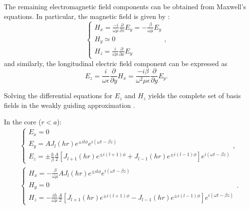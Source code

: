The remaining electromagnetic field components can be obtained from Maxwell's equations. In particular, the magnetic field is given by \cite{yariv2007photonics}:
\begin{equation}
    \begin{cases}
        H_x=\frac{-i}{\omega\mu}\frac{\partial}{\partial z}E_y = -\frac{\beta}{\omega\mu}E_y \\
        H_y \simeq 0                                                                         \\
        H_z = \frac{i}{\omega\mu}\frac{\partial}{\partial x}E_y
    \end{cases},
\end{equation}
and similarly, the longitudinal electric field component can be expressed as
\begin{equation}
    E_z = \frac{i}{\omega\epsilon}\frac{\partial}{\partial y}H_x = \frac{-i\beta}{\omega^2\mu\epsilon}\frac{\partial}{\partial y}E_y.
\end{equation}

Solving the differential equations for $E_z$ and $H_z$ yields the complete set of basis fields in the weakly guiding approximation \cite{yariv2007photonics}.

In the core ($r<a$):
\begin{align}
    & \begin{cases}
        E_x = 0                                                  \\
        E_y = A J_l(hr) e^{\pm il\phi} e^{i(\omega t - \beta z)} \\
        E_z = \pm \frac{h}{\beta}\frac{A}{2} [J_{l+1}(hr)e^{\pm i(l+1)\phi} + J_{l-1}(hr)e^{\pm i(l-1)\phi}] e^{i(\omega t - \beta z)}
    \end{cases},\label{eq:E_core}        \\[3mm]
    & \begin{cases}
        H_x = -\frac{\beta}{\omega\mu} A J_l(hr) e^{\pm il\phi} e^{i(\omega t - \beta z)} \\
        H_y =0\\
        H_z = -\frac{ih}{\omega\mu} \frac{A}{2} [J_{l+1}(hr)e^{\pm i(l+1)\phi} - J_{l-1}(hr)e^{\pm i(l-1)\phi}] e^{i(\omega t - \beta z)}
    \end{cases}.\label{eq:H_core}
\end{align}

